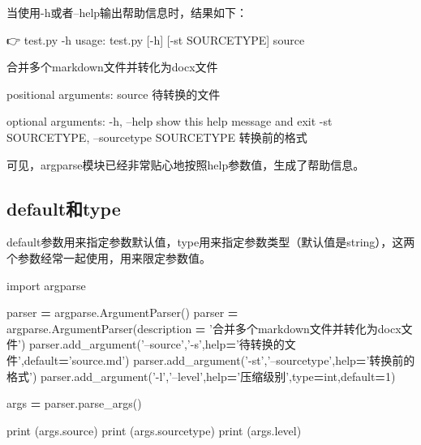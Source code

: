 \documentclass[]{ctexbook}
\newenvironment{Shaded}{\begin{snugshade}}{\end{snugshade}}
\newcommand{\BuiltInTok}[1]{#1}
\newcommand{\DecValTok}[1]{\textcolor[rgb]{0.00,0.00,0.81}{#1}}
\newcommand{\ExtensionTok}[1]{#1}
\newcommand{\ImportTok}[1]{#1}
\newcommand{\NormalTok}[1]{#1}
\newcommand{\OperatorTok}[1]{\textcolor[rgb]{0.81,0.36,0.00}{\textbf{#1}}}
\newcommand{\StringTok}[1]{\textcolor[rgb]{0.31,0.60,0.02}{#1}}
\begin{document}
当使用-h或者--help输出帮助信息时，结果如下：

\begin{Shaded}
\begin{Highlighting}[]
\NormalTok{ 👉  }\ExtensionTok{test.py}\NormalTok{ -h}
\ExtensionTok{usage}\NormalTok{: test.py [-h] [-st SOURCETYPE] source}

\NormalTok{合并多个}\ExtensionTok{markdown}\NormalTok{文件并转化为docx文件}

\ExtensionTok{positional}\NormalTok{ arguments:}
  \BuiltInTok{source}\NormalTok{                待转换的文件}

\ExtensionTok{optional}\NormalTok{ arguments:}
  \ExtensionTok{-h}\NormalTok{, --help            show this help message and exit}
  \ExtensionTok{-st}\NormalTok{ SOURCETYPE, --sourcetype SOURCETYPE}
\NormalTok{                        转换前的格式}
\end{Highlighting}
\end{Shaded}

可见，argparse模块已经非常贴心地按照help参数值，生成了帮助信息。

\hypertarget{defaultux548ctype}{%
\subsection{default和type}\label{defaultux548ctype}}

default参数用来指定参数默认值，type用来指定参数类型（默认值是string），这两个参数经常一起使用，用来限定参数值。

\begin{Shaded}
\begin{Highlighting}[]
\ImportTok{import}\NormalTok{ argparse}

\NormalTok{parser }\OperatorTok{=}\NormalTok{ argparse.ArgumentParser()}
\NormalTok{parser }\OperatorTok{=}\NormalTok{ argparse.ArgumentParser(description }\OperatorTok{=} \StringTok{'合并多个markdown文件并转化为docx文件'}\NormalTok{)}
\NormalTok{parser.add_argument(}\StringTok{'--source'}\NormalTok{,}\StringTok{'-s'}\NormalTok{,}\BuiltInTok{help}\OperatorTok{=}\StringTok{'待转换的文件'}\NormalTok{,default}\OperatorTok{=}\StringTok{'source.md'}\NormalTok{)}
\NormalTok{parser.add_argument(}\StringTok{'-st'}\NormalTok{,}\StringTok{'--sourcetype'}\NormalTok{,}\BuiltInTok{help}\OperatorTok{=}\StringTok{'转换前的格式'}\NormalTok{)}
\NormalTok{parser.add_argument(}\StringTok{'-l'}\NormalTok{,}\StringTok{'--level'}\NormalTok{,}\BuiltInTok{help}\OperatorTok{=}\StringTok{'压缩级别'}\NormalTok{,}\BuiltInTok{type}\OperatorTok{=}\BuiltInTok{int}\NormalTok{,default}\OperatorTok{=}\DecValTok{1}\NormalTok{)}

\NormalTok{args }\OperatorTok{=}\NormalTok{ parser.parse_args()}

\BuiltInTok{print}\NormalTok{ (args.source)}
\BuiltInTok{print}\NormalTok{ (args.sourcetype)}
\BuiltInTok{print}\NormalTok{ (args.level)}
\end{Highlighting}
\end{Shaded}
\end{document}
